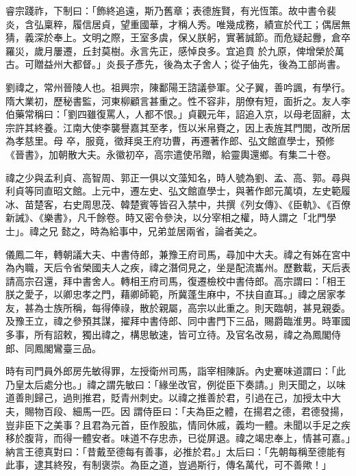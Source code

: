 \begin{pinyinscope}
 睿宗踐祚，下制曰：「飾終追遠，斯乃舊章；表德旌賢，有光恆策。故中書令裴炎，含弘稟粹，履信居貞，望重國華，才稱人秀。唯幾成務，績宣於代工；偶居無猜，義深於奉上。文明之際，王室多虞，保乂朕躬，實著誠節。而危疑起釁，倉卒羅災，歲月屢遷，丘封莫樹。永言先正，感悼良多。宜追賁
 於九原，俾增榮於萬古。可贈益州大都督。」炎長子彥先，後為太子舍人；從子伷先，後為工部尚書。



 劉禕之，常州晉陵人也。祖興宗，陳鄱陽王諮議參軍。父子翼，善吟諷，有學行。隋大業初，歷秘書監，河東柳顧言甚重之。性不容非，朋僚有短，面折之。友人李伯藥常稱曰：「劉四雖復罵人，人都不恨。」貞觀元年，詔追入京，以母老固辭，太宗許其終養。江南大使李襲譽嘉其至孝，恆以米帛賚之，因上表旌其門閭，改所居為孝慈里。母
 卒，服竟，徵拜吳王府功曹，再遷著作郎、弘文館直學士，預修《晉書》，加朝散大夫。永徽初卒，高宗遣使吊贈，給靈輿還鄉。有集二十卷。



 禕之少與孟利貞、高智周、郭正一俱以文藻知名，時人號為劉、孟、高、郭。尋與利貞等同直昭文館。上元中，遷左史、弘文館直學士，與著作郎元萬頃，左史範履冰、苗楚客，右史周思茂、韓楚賓等皆召入禁中，共撰《列女傳》、《臣軌》、《百僚新誡》、《樂書》，凡千餘卷。時又密令參決，以分宰相之權，時人謂之「北門學士」。禕之兄
 懿之，時為給事中，兄弟並居兩省，論者美之。



 儀鳳二年，轉朝議大夫、中書侍郎，兼豫王府司馬，尋加中大夫。禕之有姊在宮中為內職，天后令省榮國夫人之疾，禕之潛伺見之，坐是配流巂州。歷數載，天后表請高宗召還，拜中書舍人。轉相王府司馬，復遷檢校中書侍郎。高宗謂曰：「相王朕之愛子，以卿忠孝之門，藉卿師範，所冀蓬生麻中，不扶自直耳。」禕之居家孝友，甚為士族所稱，每得俸祿，散於親屬，高宗以此重之。則天臨朝，甚見親委。
 及豫王立，禕之參預其謀，擢拜中書侍郎、同中書門下三品，賜爵臨淮男。時軍國多事，所有詔敕，獨出禕之，構思敏速，皆可立待。及官名改易，禕之為鳳閣侍郎、同鳳閣鸞臺三品。



 時有司門員外郎房先敏得罪，左授衛州司馬，詣宰相陳訴。內史騫味道謂曰：「此乃皇太后處分也。」禕之謂先敏曰：「緣坐改官，例從臣下奏請。」則天聞之，以味道善則歸己，過則推君，貶青州刺史。以禕之推善於君，引過在己，加授太中大夫，賜物百段、細馬一匹。因
 謂侍臣曰：「夫為臣之體，在揚君之德，君德發揚，豈非臣下之美事？且君為元首，臣作股肱，情同休戚，義均一體。未聞以手足之疾移於腹背，而得一體安者。味道不存忠赤，已從屏退。禕之竭忠奉上，情甚可嘉。」納言王德真對曰：「昔戴至德每有善事，必推於君。」太后曰：「先朝每稱至德能有此事，逮其終歿，有制褒崇。為臣之道，豈過斯行，傳名萬代，可不善歟！」




\end{pinyinscope}
